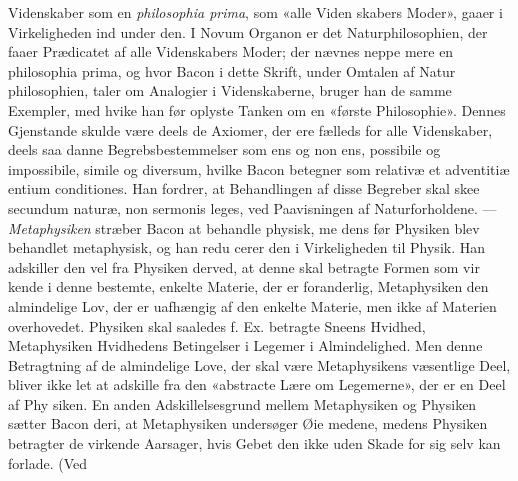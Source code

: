 \documentclass[12pt,a4paper]{book}
\begin{document}
Videnskaber som en \emph{philosophia prima}, som «alle Viden\-%
skabers Moder», gaaer i Virkeligheden ind under den. I Novum
Organon er det Naturphilosophien, der faaer Prædicatet af alle
Videnskabers Moder; der nævnes neppe mere en philosophia
prima, og hvor Bacon i dette Skrift, under Omtalen af Natur\-%
philosophien, taler om Analogier i Videnskaberne, bruger han
de samme Exempler, med hvike han før oplyste Tanken om
en «første Philosophie». Dennes Gjenstande skulde være deels
de Axiomer, der ere fælleds for alle Videnskaber, deels saa\-%
danne Begrebsbestemmelser som ens og non ens, possibile og
impossibile, simile og diversum, hvilke Bacon betegner som
relativæ et adventitiæ entium conditiones. Han fordrer, at
Behandlingen af disse Begreber skal skee secundum naturæ,
non sermonis leges, ved Paavisningen af Naturforholdene. ---
\emph{Metaphysiken} stræber Bacon at behandle physisk, me\-%
dens før Physiken blev behandlet metaphysisk, og han redu\-%
cerer den i Virkeligheden til Physik. Han adskiller den vel
fra Physiken derved, at denne skal betragte Formen som vir\-%
kende i denne bestemte, enkelte Materie, der er foranderlig,
Metaphysiken den almindelige Lov, der er uafhængig af den
enkelte Materie, men ikke af Materien overhovedet. Physiken
skal saaledes f. Ex. betragte Sneens Hvidhed, Metaphysiken
Hvidhedens Betingelser i Legemer i Almindelighed. Men
denne Betragtning af de almindelige Love, der skal være
Metaphysikens væsentlige Deel, bliver ikke let at adskille fra
den «abstracte Lære om Legemerne», der er en Deel af Phy\-%
siken. En anden Adskillelsesgrund mellem Metaphysiken og
Physiken sætter Bacon deri, at Metaphysiken undersøger Øie\-%
medene, medens Physiken betragter de virkende Aarsager,
hvis Gebet den ikke uden Skade for sig selv kan forlade. (Ved
\end{document}
